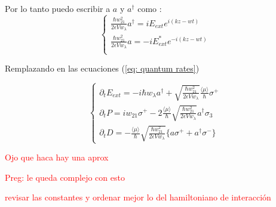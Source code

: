 Por lo tanto puedo escribir a $a$ y $a^{\dagger}$ como :
\begin{equation}
\begin{cases}
\frac{\hbar w_{21}^2}{2\epsilon V w_{\lambda} } a^{\dagger} = i E_{ext} e^{i(kz-wt)}\\
\frac{\hbar w_{21}^2}{2\epsilon V w_{\lambda} }  a = -i E^*_{ext} e^{-i(kz-wt)}\\
\end{cases}
\end{equation}

Remplazando en las ecuaciones (\ref{eq: quantum rates})

\begin{equation}
	\begin{cases}
		\partial_t E_{ext}= -i \hbar w_{\lambda}a^{\dagger} + \sqrt{ \frac{\hbar w_{21}^2}{2\epsilon V w_{\lambda} } }  \frac{\langle \mu \rangle }{\hbar}	 \sigma^+ \\
		\partial_t P =  iw_{21}\sigma^+ - 2 \frac{\langle \mu \rangle }{\hbar} \sqrt{ \frac{\hbar w_{21}^2}{2\epsilon V w_{\lambda} } }   a^{\dagger}\sigma_3\\
		\partial_t D=-\frac{\langle \mu \rangle }{\hbar}	\sqrt{ \frac{\hbar w_{21}^2}{2\epsilon V w_{\lambda} } } \{ a\sigma^+ + a^{\dagger}\sigma^-   \}
	\end{cases}
	\label{eq: quantum clasic rates}
\end{equation}



\textcolor{red}{Ojo que haca hay una aprox}

\textcolor{red}{Preg: le queda complejo con esto}


\textcolor{red}{revisar las constantes y ordenar mejor lo del hamiltoniano de interacción}
